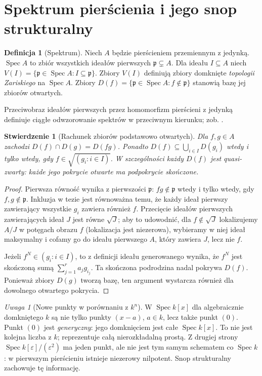 \documentclass[11pt,a4paper,openany]{report}
\numberwithin{equation}{section}
\theoremstyle{plain}
\newtheorem{stwierdzenie}[twierdzenie]{Stwierdzenie}
\theoremstyle{definition}
\newtheorem{definicja}[twierdzenie]{Definicja}
\theoremstyle{remark}
\newtheorem{uwaga}[twierdzenie]{Uwaga}
\newcommand{\Spec}{\operatorname{Spec}}
\begin{document}
\section{Spektrum pierścienia i jego snop strukturalny}
\label{sec:spek-snop}

\begin{definicja}[Spektrum]\label{ga:def:prime-spectrum}
Niech $A$ będzie pierścieniem przemiennym z jedynką.
$\Spec A$ to zbiór wszystkich ideałów pierwszych
$\mathfrak p\subsetneq A$. Dla ideału $I\subseteq A$
niech $V(I)=\{\mathfrak p\in\Spec A:I\subseteq\mathfrak p\}$.
Zbiory $V(I)$ definiują zbiory domknięte
\emph{topologii Zariskiego} na $\Spec A$.
Zbiory $D(f)=\{\mathfrak p\in\Spec A:f\notin\mathfrak p\}$
stanowią bazę jej zbiorów otwartych.
\end{definicja}

Przeciwobraz ideałów pierwszych przez homomorfizm pierścieni z jedynką definiuje ciągłe odwzorowanie spektrów w przeciwnym kierunku; zob. .

\begin{stwierdzenie}[Rachunek zbiorów podstawowo otwartych]
Dla $f,g\in A$ zachodzi
$D(f)\cap D(g)=D(fg)$. Ponadto
$D(f)\subseteq\bigcup_{i\in I}D(g_i)$ wtedy
i tylko wtedy, gdy $f\in\sqrt{(g_i:i\in I)}$.
W szczególności każdy $D(f)$ jest quasi-zwarty:
każde jego pokrycie otwarte ma podpokrycie skończone.
\end{stwierdzenie}
\begin{proof}
Pierwsza równość wynika z pierwszości
$\mathfrak p$: $fg\notin\mathfrak p$ wtedy
i tylko wtedy, gdy $f,g\notin\mathfrak p$.
Inkluzja w tezie jest równoważna temu, że
każdy ideał pierwszy zawierający wszystkie $g_i$
zawiera również $f$. Przecięcie ideałów pierwszych
zawierających ideał $J$ jest równe $\sqrt J$;
aby to udowodnić, dla $f\notin\sqrt J$ lokalizujemy
$A/J$ w potęgach obrazu $f$ (lokalizacja jest
niezerowa), wybieramy w niej ideał maksymalny
i cofamy go do ideału pierwszego $A$,
który zawiera $J$, lecz nie $f$.

Jeżeli $f^N\in(g_i:i\in I)$, to z definicji
ideału generowanego wynika, że $f^N$ jest
skończoną sumą $\sum_{j=1}^r a_j g_{i_j}$.
Ta skończona podrodzina nadal pokrywa $D(f)$.
Ponieważ zbiory $D(g)$ tworzą bazę, ten argument
wystarcza również dla dowolnego otwartego pokrycia.
\end{proof}

\begin{uwaga}[Nowe punkty w porównaniu z $k^n$]
W $\Spec k[x]$ dla algebraicznie domkniętego $k$
są nie tylko punkty $(x-a)$, $a\in k$, lecz także
punkt $(0)$. Punkt $(0)$ jest \emph{generyczny}:
jego domknięciem jest całe $\Spec k[x]$.
To nie jest kolejna liczba z $k$; reprezentuje
całą nierozkładalną prostą. Z drugiej strony
$\Spec k[\varepsilon]/(\varepsilon^2)$ ma jeden
punkt, ale nie jest tym samym schematem co $\Spec k$:
w pierwszym pierścieniu istnieje niezerowy nilpotent.
Snop strukturalny zachowuje tę informację.
\end{uwaga}
\end{document}
